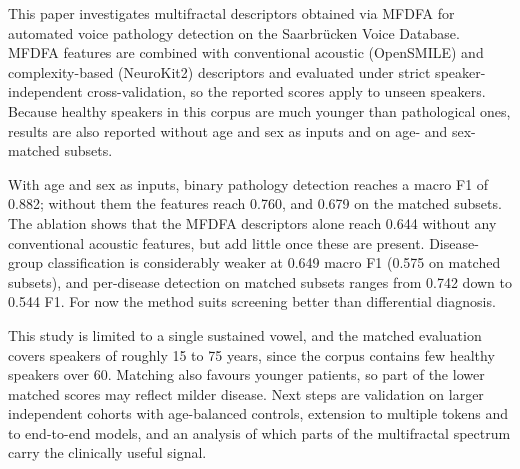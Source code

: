 \documentclass[runningheads]{llncs}
\begin{document}
  This paper investigates multifractal descriptors obtained via MFDFA for automated voice pathology detection on the Saarbrücken Voice Database. MFDFA features are combined with conventional acoustic (OpenSMILE) and complexity-based (NeuroKit2) descriptors and evaluated under strict speaker-independent cross-validation, so the reported scores apply to unseen speakers. Because healthy speakers in this corpus are much younger than pathological ones, results are also reported without age and sex as inputs and on age- and sex-matched subsets.

  With age and sex as inputs, binary pathology detection reaches a macro F1 of 0.882; without them the features reach 0.760, and 0.679 on the matched subsets. The ablation shows that the MFDFA descriptors alone reach 0.644 without any conventional acoustic features, but add little once these are present. Disease-group classification is considerably weaker at 0.649 macro F1 (0.575 on matched subsets), and per-disease detection on matched subsets ranges from 0.742 down to 0.544 F1. For now the method suits screening better than differential diagnosis.

  This study is limited to a single sustained vowel, and the matched evaluation covers speakers of roughly 15 to 75 years, since the corpus contains few healthy speakers over 60. Matching also favours younger patients, so part of the lower matched scores may reflect milder disease. Next steps are validation on larger independent cohorts with age-balanced controls, extension to multiple tokens and to end-to-end models, and an analysis of which parts of the multifractal spectrum carry the clinically useful signal.



\end{document}
